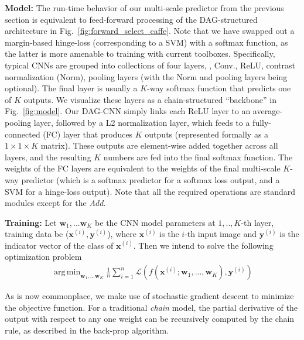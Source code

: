 \documentclass[10pt,twocolumn,letterpaper]{article}
\DeclareMathOperator*{\argmin}{arg\,min}
\begin{document}
{\bf Model:} The run-time behavior of our multi-scale predictor from the previous section is equivalent to feed-forward processing of the DAG-structured architecture in Fig.~\ref{fig:forward_select_caffe}. Note that we have swapped out a margin-based hinge-loss (corresponding to a SVM) with a softmax function, as the latter is more amenable to training with current toolboxes. Specifically, typical CNNs are grouped into collections of four layers, \ie, Conv., ReLU, contrast normalization (Norm), pooling layers (with the Norm and pooling layers being optional). The final layer is usually a $K$-way softmax function that predicts one of $K$ outputs. We visualize these layers as a chain-structured ``backbone'' in Fig.~\ref{fig:model}. Our DAG-CNN simply links each ReLU layer to an average-pooling layer, followed by a L2 normalization layer, which feeds to a fully-connected (FC) layer that produces $K$ outputs (represented formally as a $1 \times 1 \times K$ matrix). These outputs are element-wise added together across all layers, and the resulting $K$ numbers are fed into the final softmax function. The weights of the FC layers are equivalent to the weights of the final multi-scale $K$-way predictor (which is a softmax predictor for a softmax loss output, and a SVM for a hinge-loss output). Note that all the required operations are standard modules except for the \textit{Add}.


{\bf Training:} Let $\textbf{w}_1,...\textbf{w}_K$ be the CNN model parameters at $1,..,K$-th layer, training data be ($\textbf{x}^{(i)},\textbf{y}^{(i)}$), where $\textbf{x}^{(i)}$ is the $i$-th input image and $\textbf{y}^{(i)}$ is the indicator vector of the class of $\textbf{x}^{(i)}$. Then we intend to solve the following optimization problem
\vspace{-5pt}
\begin{align}
\argmin_{\textbf{w}_1,...\textbf{w}_K} \frac{1}{n}\sum_{i=1}^{n} \mathcal{L}(f(\textbf{x}^{(i)};\textbf{w}_1,...,\textbf{w}_K),\textbf{y}^{(i)})
\end{align}

As is now commonplace, we make use of stochastic gradient descent to minimize the objective function. For a traditional \textit{chain} model, the partial derivative of the output with respect to any one weight can be recursively computed by the chain rule, as described in the back-prop algorithm.%
\end{document}
